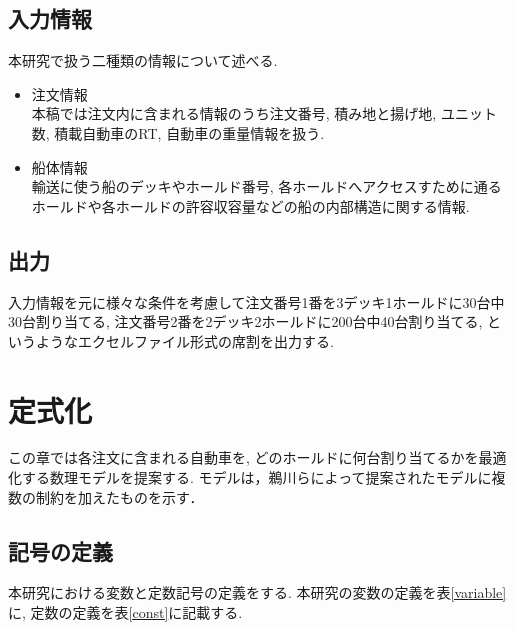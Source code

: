 \documentclass[a4j,11pt,twocolumn]{jsarticle}
\begin{document}
\subsection{入力情報}
本研究で扱う二種類の情報について述べる.
\begin{itemize}

\item 注文情報 \\
本稿では注文内に含まれる情報のうち注文番号, 積み地と揚げ地, ユニット数, 積載自動車のRT, 自動車の重量情報を扱う.

\item 船体情報 \\
輸送に使う船のデッキやホールド番号, 各ホールドへアクセスすために通るホールドや各ホールドの許容収容量などの船の内部構造に関する情報.

\end{itemize}

\subsection{出力}
入力情報を元に様々な条件を考慮して注文番号1番を3デッキ1ホールドに30台中30台割り当てる, 注文番号2番を2デッキ2ホールドに200台中40台割り当てる, というようなエクセルファイル形式の席割を出力する.


\section{定式化}
この章では各注文に含まれる自動車を, どのホールドに何台割り当てるかを最適化する数理モデルを提案する. モデルは，鵜川らによって提案されたモデル\cite{ukawa}に複数の制約を加えたものを示す．

\subsection{記号の定義}
本研究における変数と定数記号の定義をする. 本研究の変数の定義を表\ref{variable}に, 定数の定義を表\ref{const}に記載する. \\


\clearpage
\end{document}
